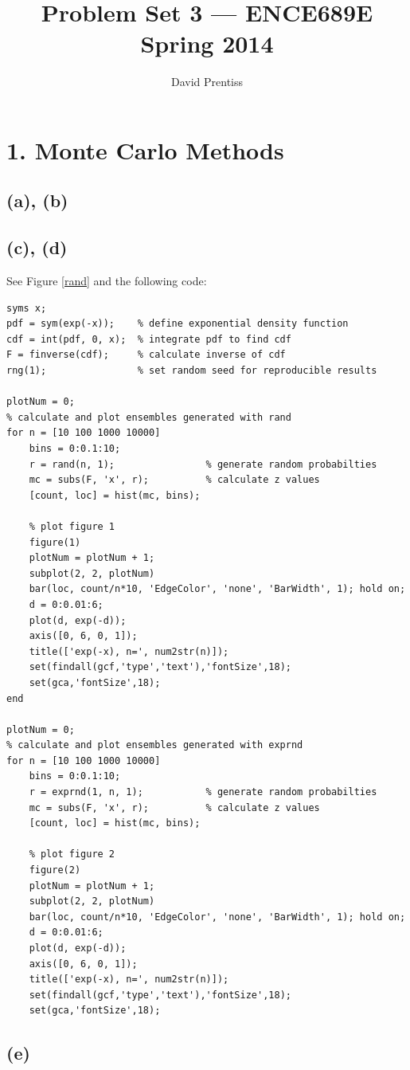\documentclass[fleqn, letterpaper]{tufte-handout}
\title{Problem Set 3 --- ENCE689E Spring 2014}
\author{David Prentiss}
\begin{document}
\maketitle

\section{1. Monte Carlo Methods}
\subsection{(a), (b)}
\newpage
\subsection{(c), (d)}
See Figure \ref{rand} and the following code:
\small
\begin{verbatim}
syms x;
pdf = sym(exp(-x));    % define exponential density function
cdf = int(pdf, 0, x);  % integrate pdf to find cdf
F = finverse(cdf);     % calculate inverse of cdf
rng(1);                % set random seed for reproducible results

plotNum = 0;
% calculate and plot ensembles generated with rand
for n = [10 100 1000 10000]
    bins = 0:0.1:10;
    r = rand(n, 1);                % generate random probabilties
    mc = subs(F, 'x', r);          % calculate z values
    [count, loc] = hist(mc, bins);
    
    % plot figure 1
    figure(1)
    plotNum = plotNum + 1;
    subplot(2, 2, plotNum)
    bar(loc, count/n*10, 'EdgeColor', 'none', 'BarWidth', 1); hold on;
    d = 0:0.01:6;
    plot(d, exp(-d));
    axis([0, 6, 0, 1]);
    title(['exp(-x), n=', num2str(n)]);
    set(findall(gcf,'type','text'),'fontSize',18);
    set(gca,'fontSize',18);
end

plotNum = 0;
% calculate and plot ensembles generated with exprnd
for n = [10 100 1000 10000]
    bins = 0:0.1:10;
    r = exprnd(1, n, 1);           % generate random probabilties
    mc = subs(F, 'x', r);          % calculate z values
    [count, loc] = hist(mc, bins);
    
    % plot figure 2
    figure(2)
    plotNum = plotNum + 1;
    subplot(2, 2, plotNum)
    bar(loc, count/n*10, 'EdgeColor', 'none', 'BarWidth', 1); hold on;
    d = 0:0.01:6;
    plot(d, exp(-d));
    axis([0, 6, 0, 1]);
    title(['exp(-x), n=', num2str(n)]);
    set(findall(gcf,'type','text'),'fontSize',18);
    set(gca,'fontSize',18);
\end{verbatim}
\subsection{(e)}
\end{document}
